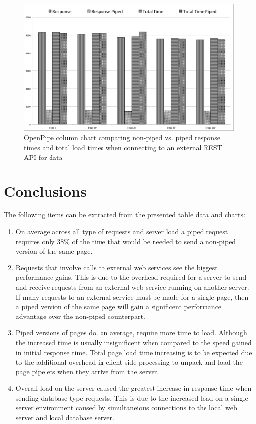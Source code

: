 \documentclass[12pt]{report}
\begin{document}
\begin{figure}[H]
\label{fig:analysisChartWebService}
\centering
\includegraphics[width=\textwidth,keepaspectratio]{figures/images/analysis_chart_webservice.png}
\caption{OpenPipe column chart comparing non-piped vs. piped response times and total load times when connecting to an external REST API for data}
\end{figure}

\section{Conclusions}
The following items can be extracted from the presented table data and charts:

\begin{enumerate}
\item On average across all type of requests and server load a piped request requires only 38\% of the time that would be needed to send a non-piped version of the same page.
\item Requests that involve calls to external web services see the biggest performance gains. This is due to the overhead required for a server to send and receive requests from an external web service running on another server. If many requests to an external service must be made for a single page, then a piped version of the same page will gain a significent performance advantage over the non-piped counterpart.
\item Piped versions of pages do. on average, require more time to load. Although the increased time is usually insignificent when compared to the speed gained in initial response time. Total page load time increasing is to be expected due to the additional overhead in client side processing to unpack and load the page pipelets when they arrive from the server. 
\item Overall load on the server caused the greatest increase in response time when sending database type requests. This is due to the increased load on a single server environment caused by simultaneious connections to the local web server and local database server. 
\end{enumerate}
\end{document}
